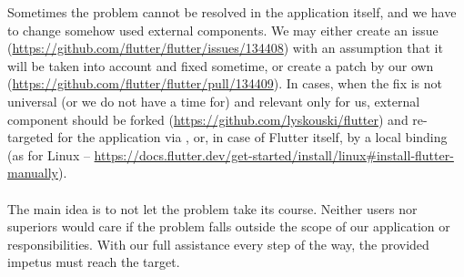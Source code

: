 \noindent Sometimes the problem cannot be resolved in the application itself, and we have to change somehow used 
external components. We may either create an issue 
(\href{https://github.com/flutter/flutter/issues/134408}{https://github.com/flutter/flutter/issues/134408}) 
with an assumption that it will be taken into account and fixed sometime, or create a patch by our own 
(\href{https://github.com/flutter/flutter/pull/134409}{https://github.com/flutter/flutter/pull/134409}). In cases, when 
the fix is not universal (or we do not have a time for) and relevant only for us, external component should be forked 
(\href{https://github.com/lyskouski/flutter}{https://github.com/lyskouski/flutter}) and re-targeted for the application
via , or, in case of Flutter itself, by a local binding (as for Linux -- 
\href{https://docs.flutter.dev/get-started/install/linux#install-flutter-manually}{https://docs.flutter.dev/get-started/install/linux\#install-flutter-manually}).\\
\\

\noindent The main idea is to not let the problem take its course. Neither users nor superiors would care if the problem 
falls outside the scope of our application or responsibilities. With our full assistance every step of the way, the 
provided impetus must reach the target.
